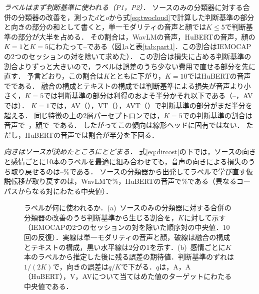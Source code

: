 \emph{ラベルはまず判断基準に使われる（P1，P2）．}
ソースのみの分類器に対する合併の分類器の改善を，測った$d$と$o$から式\eqref{eq:twocloud}で計算した判断基準の部分と向きの部分の和として書くと，単一モダリティの音声と顔では$K \le 5$で判断基準の部分が大半を占める．
その割合は，WavLMの音声，HuBERTの音声，顔の$K=1$と$K=5$にわたって--である（図\ref{fig:thresholdshare}aと表\ref{tab:part1}．この割合はIEMOCAPの2つのセッションの対を除いて求めた）．
この割合は損失に占める判断基準の割合よりずっと大きいので，ラベルは誤差のうち少ない費用で直せる部分を先に直す．
予言どおり，この割合は$K$とともに下がり，$K=10$ではHuBERTの音声でである．
融合の構成とテキストの構成では判断基準による損失が音声より小さく，$K=5$では判断基準の部分は利得のおよそ半分かそれ以下である（--，AVでは）．
$K=1$では，AV（），VT（），AVT（）で判断基準の部分がまだ半分を超える．
同じ特徴の上の2層パーセプトロンでは，$K=5$での判断基準の割合は音声で--，顔で--である．
したがってこの傾向は線形ヘッドに固有ではない．
ただし，HuBERTの音声では割合が半分を下回る．

\emph{向きはソースが決めたところにとどまる．}
式\eqref{eq:dircost}の下では，ソースの向きと感情ごとに10本のラベルを最適に組み合わせても，音声の向きによる損失のうち取り戻せるのは--\%である．
ソースの分類器から出発してラベルで学び直す仮説転移が取り戻すのは，WavLMで\%，HuBERTの音声で\%である（異なるコーパスからなる対にわたる中央値）．

\begin{figure}[t]
\centering
{}
\caption{ラベルが何に使われるか．(a)~ソースのみの分類器に対する合併の分類器の改善のうち判断基準から生じる割合を，$K$に対して示す（IEMOCAPの2つのセッションの対を除いた順序対の中央値．10回の反復）．実線は単一モダリティの音声と顔，破線は融合の構成とテキストの構成，黒い水平線は2分の1を示す．(b)~感情ごとに$K$本のラベルから推定した後に残る誤差の期待値．判断基準のずれは$1/(2K)$で，向きの誤差は$q/K$で下がる．$q$は，A，A（HuBERT），V，AVについて当てはめた値のターゲットにわたる中央値である．}
\label{fig:thresholdshare}
\end{figure}

